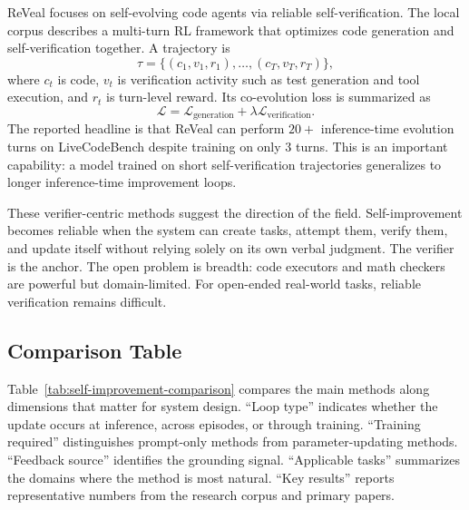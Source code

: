 ReVeal \cite{jin2025reveal} focuses on self-evolving code agents via reliable self-verification. The local corpus describes a multi-turn RL framework that optimizes code generation and self-verification together. A trajectory is
\begin{equation}
    \tau=\{(c_1,v_1,r_1),\ldots,(c_T,v_T,r_T)\},
\end{equation}
where $c_t$ is code, $v_t$ is verification activity such as test generation and tool execution, and $r_t$ is turn-level reward. Its co-evolution loss is summarized as
\begin{equation}
    \mathcal{L}=\mathcal{L}_{\mathrm{generation}}+\lambda\mathcal{L}_{\mathrm{verification}}.
\end{equation}
The reported headline is that ReVeal can perform $20+$ inference-time evolution turns on LiveCodeBench despite training on only $3$ turns. This is an important capability: a model trained on short self-verification trajectories generalizes to longer inference-time improvement loops.

These verifier-centric methods suggest the direction of the field. Self-improvement becomes reliable when the system can create tasks, attempt them, verify them, and update itself without relying solely on its own verbal judgment. The verifier is the anchor. The open problem is breadth: code executors and math checkers are powerful but domain-limited. For open-ended real-world tasks, reliable verification remains difficult.

\subsection{Comparison Table}
\label{subsec:comparison-table}

Table~\ref{tab:self-improvement-comparison} compares the main methods along dimensions that matter for system design. ``Loop type'' indicates whether the update occurs at inference, across episodes, or through training. ``Training required'' distinguishes prompt-only methods from parameter-updating methods. ``Feedback source'' identifies the grounding signal. ``Applicable tasks'' summarizes the domains where the method is most natural. ``Key results'' reports representative numbers from the research corpus and primary papers.

